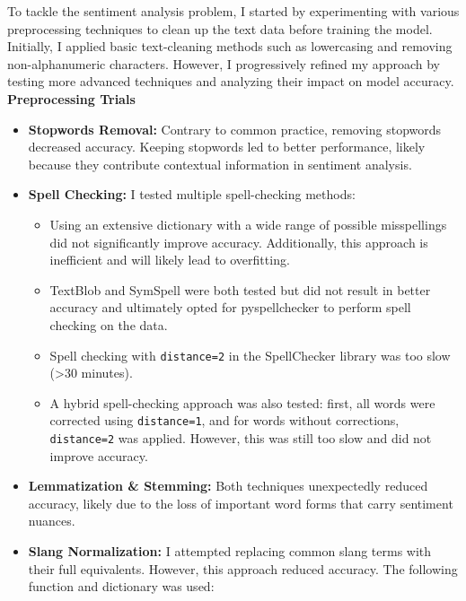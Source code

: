 \documentclass[12pt]{fphw}
\begin{document}
To tackle the sentiment analysis problem, I started by experimenting with various preprocessing techniques to clean up the text data before training the model. Initially, I applied basic text-cleaning methods such as lowercasing and removing non-alphanumeric characters. However, I progressively refined my approach by testing more advanced techniques and analyzing their impact on model accuracy.\newline\newline
\textbf{Preprocessing Trials}
\begin{itemize}
    \item \textbf{Stopwords Removal:} Contrary to common practice, removing stopwords decreased accuracy. Keeping stopwords led to better performance, likely because they contribute contextual information in sentiment analysis.
    
    \item \textbf{Spell Checking:} I tested multiple spell-checking methods:
    \begin{itemize}
        \item Using an extensive dictionary with a wide range of possible misspellings did not significantly improve accuracy. Additionally, this approach is inefficient and will likely lead to overfitting.
        \item TextBlob and SymSpell were both tested but did not result in better accuracy and ultimately opted for pyspellchecker to perform spell checking on the data.
        \item Spell checking with \texttt{distance=2} in the SpellChecker library was too slow (>30 minutes).
        \item A hybrid spell-checking approach was also tested: first, all words were corrected using \texttt{distance=1}, and for words without corrections, \texttt{distance=2} was applied. However, this was still too slow and did not improve accuracy.
    \end{itemize}
    
    \item \textbf{Lemmatization \& Stemming:} Both techniques unexpectedly reduced accuracy, likely due to the loss of important word forms that carry sentiment nuances.

    \item \textbf{Slang Normalization:} I attempted replacing common slang terms with their full equivalents. However, this approach reduced accuracy. The following function and dictionary was used:


\end{itemize}
\end{document}

